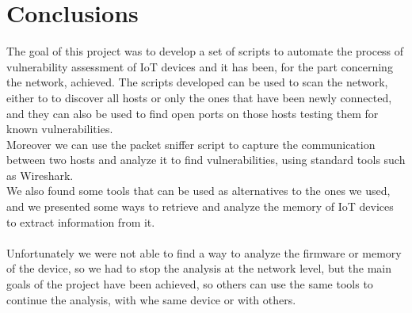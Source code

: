 \chapter{Conclusions}
The goal of this project was to develop a set of scripts to automate the process
of vulnerability assessment of IoT devices and it has been, for the part concerning
the network, achieved. The scripts developed can be used to scan the network, either
to to discover all hosts or only the ones that have been newly connected, and
they can also be used to find open ports on those hosts testing them for known vulnerabilities.\\
Moreover we can use the packet sniffer script to capture the communication between
two hosts and analyze it to find vulnerabilities, using standard tools such as Wireshark.\\
We also found some tools that can be used as alternatives to the ones we used,
and we presented some ways to retrieve and analyze the memory of IoT devices
to extract information from it.\\\\
Unfortunately we were not able to find a way to analyze the firmware or memory of the device,
so we had to stop the analysis at the network level, but the main goals of the
project have been achieved, so others can use the same tools to continue the analysis,
with whe same device or with others.